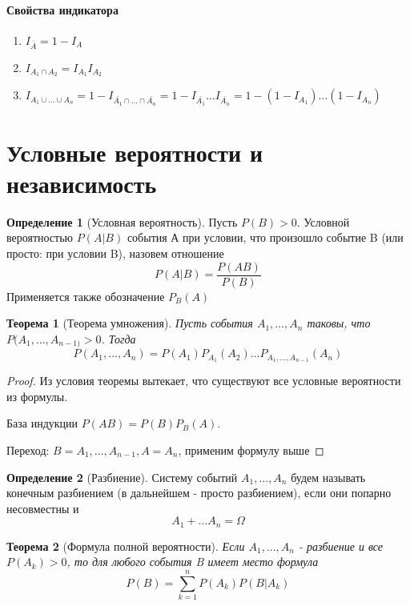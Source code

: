 \documentclass[a4paper]{article}
\newtheorem{theorem}{Теорема}[section]
\theoremstyle{definition}
\newtheorem*{definition}{Определение}
\theoremstyle{remark}
\begin{document}
\paragraph{Свойства индикатора}
\begin{enumerate}
    \item $I_{\bar{A}} = 1 - I_A$
    \item $I_{A_1 \cap A_2} = I_{A_1}I_{A_2}$
    \item $I_{A_1\cup\dots\cup A_n} = 1 - I_{\bar{A_1} \cap \dots\cap \bar{A_n}} = 1  -  I_{\bar{A_1}}\dots I_{\bar{A_n}} = 1 - (1 - I_{A_1})\dots(1 - I_{A_n})$
\end{enumerate}
\section{Условные вероятности и независимость}
\begin{definition}[Условная вероятность]
    Пусть $P(B)>0$. Условной вероятностью $P(A|B)$ события А при условии, что произошло событие B (или просто: при условии B), назовем отношение
    $$P(A|B) = \frac{P(AB)}{P(B)}$$
    Применяется также обозначение $P_B(A)$
\end{definition}
\begin{theorem}[Теорема умножения]
    Пусть события $A_1, \dots, A_n$ таковы, что $P(A_1, \dots, A_{n-1)}>0$. Тогда $$P(A_1, \dots, A_n) = P(A_1)P_{A_1}(A_2)\dots P_{A_1, \dots, A_{n-1}}(A_n)$$
\end{theorem}
\begin{proof}
    Из условия теоремы вытекает, что существуют все условные вероятности из формулы.
    
    База индукции $P(AB) = P(B)P_B(A)$.

    Переход: $B=A_1, \dots, A_{n-1}, A = A_n$, применим формулу выше
\end{proof}
\begin{definition}[Разбиение]
    Систему событий $A_1, \dots, A_n$ будем называть конечным разбиением (в дальнейшем - просто разбиением),
    если они попарно несовместны и 
    \[A_1+\dots A_n = \Omega\]
\end{definition}
\begin{theorem}[Формула полной вероятности]
    Если $A_1, \dots, A_n$ - разбиение и все $P(A_k)>0$, то для любого события B имеет
    место формула
    \[P(B) = \sum_{k = 1}^n P(A_k)P(B|A_k)\]
\end{theorem}
\end{document}
